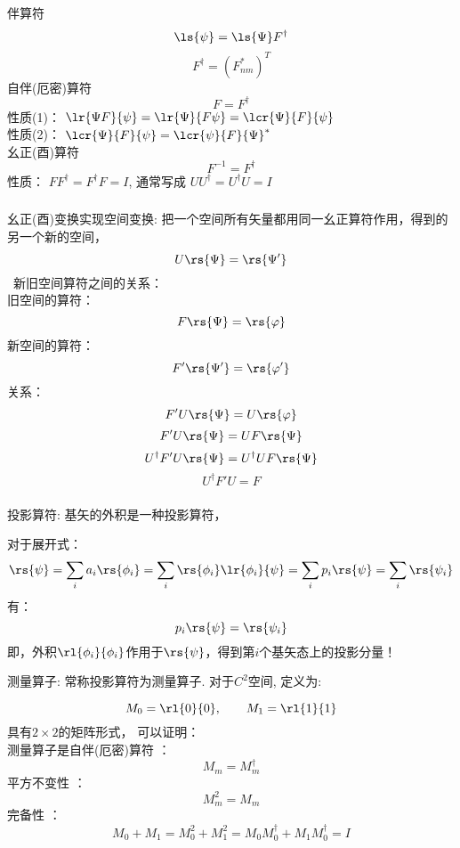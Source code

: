 \begin{frame}
    \frametitle{}
    \begin{itemize}
        \Item 伴算符   \[\ls{\psi}=\ls{\Psi}F^{\dagger} \]
        \[F^{\dagger} = (F^* _{nm})^T \]
        \Item 自伴(厄密)算符  \[F = F^{\dagger} \] 
        性质(1)： $\lr{\Psi F}{\psi}=\lr{\Psi }{F \psi}=\lcr{\Psi }{F} {\psi}$ \\
        性质(2)： $\lcr{\Psi }{F} {\psi}=\lcr{\psi }{F} {\Psi}^*$ \\ \vspace{0.6em}
        \Item 幺正(酉)算符    \[F^{-1} = F^{\dagger} \] 性质： $FF^{\dagger}=F^{\dagger}F=I$, 通常写成 $UU^{\dagger}=U^{\dagger}U=I$ \\ \vspace{1.0em}
    \end{itemize}        
\end{frame}

\begin{frame}
    \frametitle{}
    \Tips 幺正(酉)变换实现空间变换: 把一个空间所有矢量都用同一幺正算符作用，得到的另一个新的空间，
    \[U\rs{\Psi} =\rs{\Psi'}\]
    {\Bullet}~新旧空间算符之间的关系： \\
        旧空间的算符： \[F \rs{\Psi}=\rs{\varphi}\]
        新空间的算符： \[F' \rs{\Psi'}=\rs{\varphi'}\]
        关系：
        \[F' U\rs{\Psi}=U\rs{\varphi}\]
        \[F' U\rs{\Psi}=UF \rs{\Psi}\]
        \[U^{\dagger}F' U\rs{\Psi}=U^{\dagger}UF \rs{\Psi}\]
        \[U^{\dagger}F' U=F \]
\end{frame}

\begin{frame}
    \frametitle{}
    \begin{itemize}
    \Item 投影算符: 基矢的外积是一种投影算符，
    \end{itemize}
    对于展开式： 
    \[\rs{\psi}=\sum_i a_i \rs{\phi_i}=\sum_i \rs{\phi_i} \lr{\phi_i}{\psi}=\sum_i p_i \rs{\psi} =\sum_i \rs{\psi_i}\]
    有：\[p_i \rs{\psi} =\rs{\psi_i}\]
    即，外积$\rl{\phi_i}{\phi_i}$作用于$\rs{\psi}$，得到第$i$个基矢态上的投影分量！\\
\end{frame}

\begin{frame}    
    \begin{itemize}
        \Item 测量算子: 常称投影算符为测量算子. 对于$C^2$空间, 定义为:
        \end{itemize}
    \[M_0=\rl{0}{0}, \qquad M_1=\rl{1}{1} \]
    具有$2\times 2$的矩阵形式，
    可以证明：\\
    {\bullet} 测量算子是自伴(厄密)算符 ：\[M_m = M_m ^{\dagger} \]
    {\bullet} 平方不变性 ：\[M_m ^2 = M_m \]
    {\bullet} 完备性 ：\[M_0 + M_1 = M_0 ^2 + M_1 ^2 = M_0 M_0 ^\dagger + M_1 M_0 ^\dagger=I\]
\end{frame}

